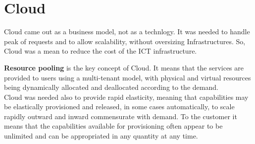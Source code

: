 \chapter{Cloud}
Cloud came out as a business model, not as a technlogy.
It was needed to handle peak of requests and to allow scalability, without oversizing Infrastructures.
So, Cloud was a mean to reduce the cost of the ICT infrastructure.

\textbf{Resource pooling} is the key concept of Cloud. It means that the services are provided to users using a multi-tenant model, with physical and virtual resources being dynamically allocated and deallocated according to the demand.\\
Cloud was needed also to provide rapid elasticity, meaning that capabilities may be elastically provisioned and released, in some cases automatically, to scale rapidly outward and inward commensurate with demand. To the customer it means that the capabilities available for provisioning often appear to be unlimited and can be appropriated in any quantity at any time.

